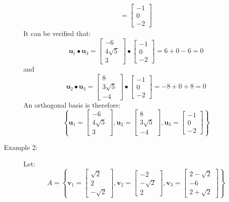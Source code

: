 \documentclass{article}
\begin{document}
\begin{description}
\begin{align*}
= \begin{bmatrix} -1 \\ 0 \\ -2 \end{bmatrix} 
\end{align*}
It can be verified that:
\[\mathbf{u}_1 \bullet \mathbf{u}_3 = \begin{bmatrix} -6 \\ 4\sqrt{5} \\ 3 \end{bmatrix} \bullet \begin{bmatrix} -1 \\ 0 \\ -2 \end{bmatrix} = 6 + 0 - 6 = 0\] 
and 
\[\mathbf{u}_2 \bullet \mathbf{u}_3 = \begin{bmatrix} 8 \\ 3\sqrt{5} \\ -4 \end{bmatrix} \bullet \begin{bmatrix} -1 \\ 0 \\ -2 \end{bmatrix} = -8 + 0 + 8 = 0\] 
An orthogonal basis is therefore:
\[\left\{\mathbf{u}_1 = \begin{bmatrix} -6 \\ 4 \sqrt{5} \\ 3 \end{bmatrix}, \mathbf{u}_2 = \begin{bmatrix} 8 \\ 3\sqrt{5} \\ -4 \end{bmatrix}, \mathbf{u}_3 = \begin{bmatrix} -1 \\ 0 \\ -2 \end{bmatrix}\right\}\]
\item[Example 2:] Let:
\[A = \left\{\mathbf{v}_1 = \begin{bmatrix} \sqrt{2} \\ 2 \\ -\sqrt{2} \end{bmatrix}, \mathbf{v}_2 = \begin{bmatrix} -2 \\ -\sqrt{2} \\ 2 \end{bmatrix}, \mathbf{v}_3 = \begin{bmatrix} 2 - \sqrt{2} \\ -6 \\ 2 + \sqrt{2} \end{bmatrix}\right\}\]

\end{description}
\end{document}
